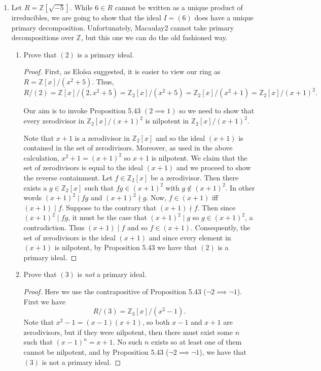 \documentclass[11pt,oneside,english]{amsart}
\theoremstyle{definition}
\newcommand{\lspace}{\vspace{5mm}}
\newcommand{\MB}[1]{\mathbb{#1}}
\begin{document}
\rightline{\today}

\lspace




\begin{enumerate}[leftmargin=*]
\itemsep5mm

\item Let $R = \mathbb{Z}[\sqrt{-5}]$. While $6 \in R$ cannot be written as a unique product of irreducibles, we are going to show that the ideal $I = (6)$ does have a unique primary decomposition. Unfortunately, Macaulay2 cannot take primary decompositions over $\mathbb{Z}$, but this one we can do the old fashioned way.	
\begin{enumerate}
\itemsep3mm
\item Prove that $(2)$ is a primary ideal.
\begin{proof}
First, as Elo\'isa suggested, it is easier to view our ring as $R=\MB{Z}[x]/(x^2+5)$. Thus,
\[
R/(2)=\MB{Z}[x]/(2,x^2+5)=\MB{Z}_2[x]/(x^2+5)=\MB{Z}_2[x]/(x^2+1)=\MB{Z}_2[x]/(x+1)^2.
\]


Our aim is to invoke Proposition 5.43 $(2\implies 1)$ so we need to show that every zerodivisor in $\MB{Z}_2[x]/(x+1)^2$ is nilpotent in $\MB{Z}_2[x]/(x+1)^2$. 

Note that $x+1$ is a zerodivisor in $\MB{Z}_2[x]$ and so the ideal $(x+1)$ is contained in the set of zerodivisors. Moreover, as used in the above calculation, $x^2+1=(x+1)^2$ so $x+1$ is nilpotent. We claim that the set of zerodivisors is equal to the ideal $(x+1)$ and we proceed to show the reverse containment. Let $f\in\MB{Z}_2[x]$ be a zerodivisor. Then there exists a $g\in \MB{Z}_2[x]$ such that $fg\in(x+1)^2$ with $g\notin(x+1)^2$. In other words $(x+1)^2\mid fg$ and $(x+1)^2\nmid g$. Now, $f\in(x+1)$ iff $(x+1)\mid f$. Suppose to the contrary that $(x+1)\nmid f$. Then since $(x+1)^2\mid fg$, it must be the case that $(x+1)^2\mid g$ so $g\in(x+1)^2$, a contradiction. Thus $(x+1)\mid f$ and so $f\in (x+1)$. Consequently, the set of zerodivisors is the ideal $(x+1)$ and since every element in $(x+1)$ is nilpotent, by Proposition 5.43 we have that $(2)$ is a primary ideal.
\end{proof}

\item Prove that $(3)$ is \emph{not} a primary ideal.
\begin{proof}
Here we use the contrapositive of Proposition 5.43 ($\neg 2\implies \neg 1$). First we have
\[
R/(3)=\MB{Z}_3[x]/(x^2-1).
\]
Note that $x^2-1=(x-1)(x+1)$, so both $x-1$ and $x+1$ are zerodivisors, but if they were nilpotent, then there must exist some $n$ such that $(x-1)^n=x+1$. No such $n$ exists so at least one of them cannot be nilpotent, and by Proposition 5.43 ($\neg 2\implies \neg 1$), we have that $(3)$ is not a primary ideal.
\end{proof}


\end{enumerate}
\end{enumerate}
\end{document}
